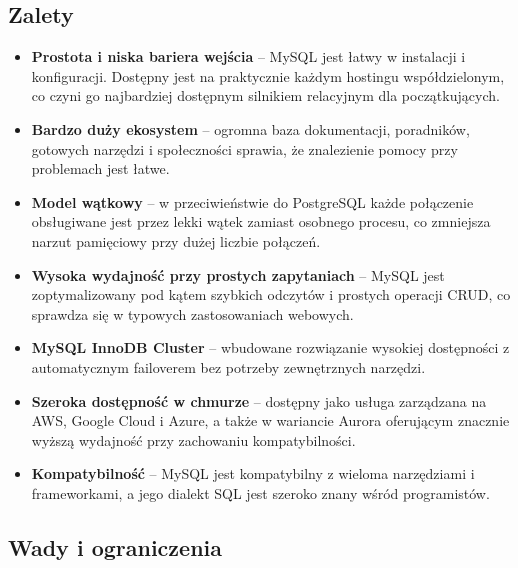 \subsection{Zalety}

\begin{itemize}
    \item \textbf{Prostota i niska bariera wejścia} -- MySQL jest łatwy
    w instalacji i konfiguracji. Dostępny jest na praktycznie każdym
    hostingu współdzielonym, co czyni go najbardziej dostępnym silnikiem
    relacyjnym dla początkujących.
    \item \textbf{Bardzo duży ekosystem} -- ogromna baza dokumentacji,
    poradników, gotowych narzędzi i społeczności sprawia, że znalezienie
    pomocy przy problemach jest łatwe.
    \item \textbf{Model wątkowy} -- w przeciwieństwie do PostgreSQL każde
    połączenie obsługiwane jest przez lekki wątek zamiast osobnego procesu,
    co zmniejsza narzut pamięciowy przy dużej liczbie połączeń.
    \item \textbf{Wysoka wydajność przy prostych zapytaniach} -- MySQL
    jest zoptymalizowany pod kątem szybkich odczytów i prostych operacji
    CRUD, co sprawdza się w typowych zastosowaniach webowych.
    \item \textbf{MySQL InnoDB Cluster} -- wbudowane rozwiązanie wysokiej
    dostępności z automatycznym failoverem bez potrzeby zewnętrznych narzędzi.
    \item \textbf{Szeroka dostępność w chmurze} -- dostępny jako usługa
    zarządzana na AWS, Google Cloud i Azure, a także w wariancie Aurora
    oferującym znacznie wyższą wydajność przy zachowaniu kompatybilności.
    \item \textbf{Kompatybilność} -- MySQL jest kompatybilny z wieloma
    narzędziami i frameworkami, a jego dialekt SQL jest szeroko znany
    wśród programistów.
\end{itemize}

\subsection{Wady i ograniczenia}

